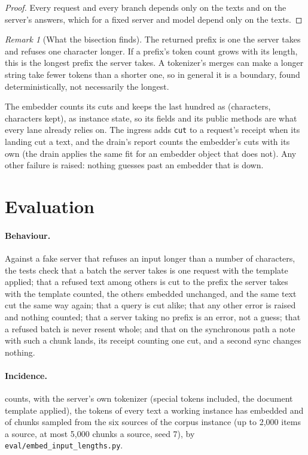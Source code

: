 \documentclass[11pt]{article}
\theoremstyle{plain}
\theoremstyle{remark}
\newtheorem{remark}{Remark}
\newcommand{\code}[1]{\texttt{#1}}
\begin{document}
\begin{proof}
Every request and every branch depends only on the texts and on the server's answers, which for a
fixed server and model depend only on the texts.
\end{proof}

\begin{remark}[What the bisection finds]
The returned prefix is one the server takes and refuses one character longer. If a prefix's token
count grows with its length, this is the longest prefix the server takes. A tokenizer's merges can
make a longer string take fewer tokens than a shorter one, so in general it is a boundary, found
deterministically, not necessarily the longest.
\end{remark}

The embedder counts its cuts and keeps the last hundred as (characters, characters kept), as
instance state, so its fields and its public methods are what every lane already relies on. The
ingress adds \code{cut} to a request's receipt when its landing cut a text, and the drain's report
counts the embedder's cuts with its own (the drain applies the same fit for an embedder object
that does not). Any other failure is raised: nothing guesses past an embedder that is down.

\section{Evaluation}\label{sec:eval}

\paragraph{Behaviour.} Against a fake server that refuses an input longer than a number of
characters, the tests check that a batch the server takes is one request with the template applied;
that a refused text among others is cut to the prefix the server takes with the template counted,
the others embedded unchanged, and the same text cut the same way again; that a query is cut alike;
that any other error is raised and nothing counted; that a server taking no prefix is an error,
not a guess; that a refused batch is never resent whole; and that on the synchronous path a note
with such a chunk lands, its receipt counting one cut, and a second sync changes nothing.

\paragraph{Incidence.}  counts, with the server's own tokenizer (special
tokens included, the document template applied), the tokens of every text a working instance has
embedded and of chunks sampled from the six sources of the corpus instance (up to 2{,}000 items
a source, at most 5{,}000 chunks a source, seed 7), by \code{eval/embed\_input\_lengths.py}.
\end{document}
